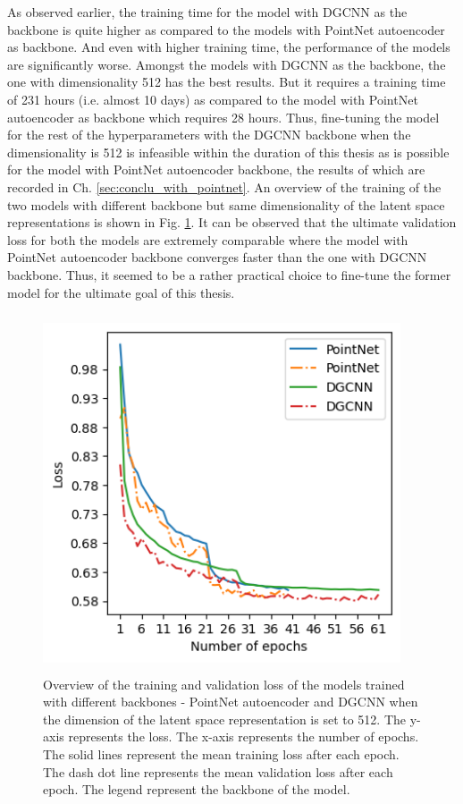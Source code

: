 As observed earlier, the training time for the model with \ac{DGCNN} as the backbone is quite higher as compared to the models with PointNet autoencoder as backbone. And even with higher training time, the performance of the models are significantly worse. Amongst the models with \ac{DGCNN} as the backbone, the one with dimensionality 512 has the best results. But it requires a training time of 231 hours (i.e. almost 10 days) as compared to the model with PointNet autoencoder as backbone which requires 28 hours. Thus, fine-tuning the model for the rest of the hyperparameters with the \ac{DGCNN} backbone when the dimensionality is 512 is infeasible within the duration of this thesis as is possible for the model with PointNet autoencoder backbone, the results of which are recorded in Ch. \ref{sec:conclu_with_pointnet}. An overview of the training of the two models with different backbone but same dimensionality of the latent space representations is shown in Fig. \ref{fig:loss_camparison}. It can be observed that the ultimate validation loss for both the models are extremely comparable where the model with PointNet autoencoder backbone converges faster than the one with \ac{DGCNN} backbone. Thus, it seemed to be a rather practical choice to fine-tune the former model for the ultimate goal of this thesis. 

\begin{figure}[H]
  \centering
  \includegraphics[width=300pt,height=300pt]{pictures/loss_comparison.png}
  \caption{Overview of the training and validation loss of the models trained with different backbones - PointNet autoencoder and \ac{DGCNN} when the dimension of the latent space representation is set to 512. The y-axis represents the loss. The x-axis represents the number of epochs. The solid lines represent the mean training loss after each epoch. The dash dot line represents the mean validation loss after each epoch. The legend represent the backbone of the model. }
  \label{fig:loss_camparison}
\end{figure}

